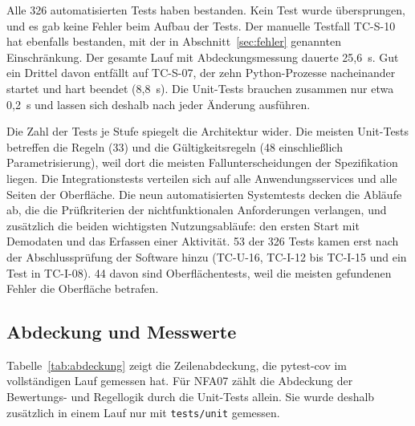 Alle 326 automatisierten Tests haben bestanden. Kein Test wurde übersprungen, und es gab keine Fehler beim Aufbau der Tests. Der manuelle Testfall TC-S-10 hat ebenfalls bestanden, mit der in Abschnitt~\ref{sec:fehler} genannten Einschränkung. Der gesamte Lauf mit Abdeckungsmessung dauerte 25,6~s. Gut ein Drittel davon entfällt auf TC-S-07, der zehn Python-Prozesse nacheinander startet und hart beendet (8,8~s). Die Unit-Tests brauchen zusammen nur etwa 0,2~s und lassen sich deshalb nach jeder Änderung ausführen.

Die Zahl der Tests je Stufe spiegelt die Architektur wider. Die meisten Unit-Tests betreffen die Regeln (33) und die Gültigkeitsregeln (48 einschließlich Parametrisierung), weil dort die meisten Fallunterscheidungen der Spezifikation liegen. Die Integrationstests verteilen sich auf alle Anwendungsservices und alle Seiten der Oberfläche. Die neun automatisierten Systemtests decken die Abläufe ab, die die Prüfkriterien der nichtfunktionalen Anforderungen verlangen, und zusätzlich die beiden wichtigsten Nutzungsabläufe: den ersten Start mit Demodaten und das Erfassen einer Aktivität. 53 der 326 Tests kamen erst nach der Abschlussprüfung der Software hinzu (TC-U-16, TC-I-12 bis TC-I-15 und ein Test in TC-I-08). 44 davon sind Oberflächentests, weil die meisten gefundenen Fehler die Oberfläche betrafen.

\subsection{Abdeckung und Messwerte}\label{sec:abdeckung}
Tabelle~\ref{tab:abdeckung} zeigt die Zeilenabdeckung, die pytest-cov im vollständigen Lauf gemessen hat. Für NFA07 zählt die Abdeckung der Bewertungs- und Regellogik durch die Unit-Tests allein. Sie wurde deshalb zusätzlich in einem Lauf nur mit \texttt{tests/unit} gemessen.

